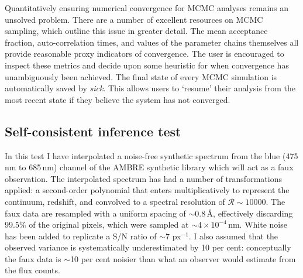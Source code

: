 \documentclass{aastex}
\newcommand{\sick}{\textit{sick}}
\begin{document}
Quantitatively ensuring numerical convergence for MCMC analyses remains an unsolved problem. There are a number of excellent resources on MCMC sampling, which outline this issue in greater detail. The mean acceptance fraction, auto-correlation times, and values of the parameter chains themselves all provide reasonable proxy indicators of convergence. The user is encouraged to inspect these metrics and decide upon some heuristic for when convergence has unambiguously been achieved. The final state of every MCMC simulation is automatically saved by \sick{}. This allows users to `resume' their analysis from the most recent state if they believe the system has not converged.


\subsection{Self-consistent inference test}

In this test I have interpolated a noise-free synthetic spectrum from the blue (475\,nm to 685\,nm) channel of the AMBRE synthetic library \citep{ambre} which will act as a faux observation. The interpolated spectrum has had a number of transformations applied: a second-order polynomial that enters multiplicatively to represent the continuum, redshift, and convolved to a spectral resolution of $\mathcal{R} \sim 10000$. The faux data are resampled with a uniform spacing of $\sim{}0.8$\,\AA{}, effectively discarding $99.5\%$ of the original pixels, which were sampled at $\sim4\times10^{-4}$\,nm. White noise has been added to replicate a S/N ratio of $\sim 7$ px$^{-1}$. I also assumed that the observed variance is systematically underestimated by 10 per cent: conceptually the faux data is $\sim{}$10 per cent noisier than what an observer would estimate from the flux counts. 

\end{document}
